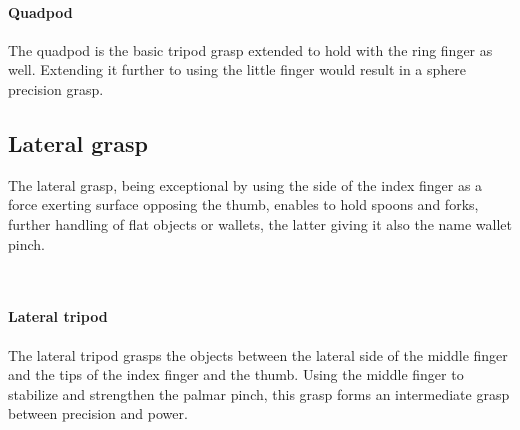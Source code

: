 \documentclass[main]{subfiles}
\begin{document}
\paragraph{Quadpod}
The quadpod is the basic tripod grasp extended to hold with the ring finger as well. Extending it further to using the little finger would result in a sphere precision grasp.

\begin{figure}[H]
\label{Quadpod-grasp}
\end{figure}

\subsection{Lateral grasp}
The lateral grasp, being exceptional by using the side of the index finger as a force exerting surface opposing the thumb, enables to hold spoons and forks, further handling of flat objects or wallets, the latter giving it also the name wallet pinch.

\begin{figure}[H]
\hspace{0.15\textwidth}
\hspace{0.15\textwidth}
\\
\label{Lateral-grasp}
\end{figure}

\paragraph{Lateral tripod}
The lateral tripod grasps the objects between the lateral side of the middle finger and the tips of the index finger and the thumb. Using the middle finger to stabilize and strengthen the palmar pinch, this grasp forms an intermediate grasp between precision and power.

\begin{figure}[H]
\label{Lateral-tripod-grasp}
\end{figure}
\end{document}

